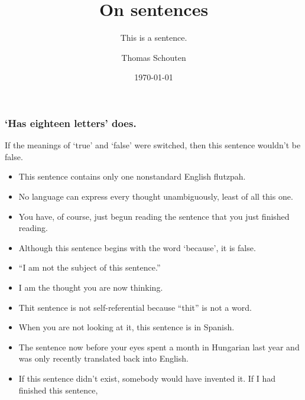 \documentclass{beamer}
\title{On sentences}
\subtitle{This is a sentence.}
\author{Thomas Schouten}
\date{\today}
\begin{document}
    \frame{\titlepage}


%

    \begin{framefont}{\small}
        \begin{frame}
            \frametitle{`Has eighteen letters' does.}
            If the meanings of `true' and `false' were switched, then this sentence wouldn't be false.
            \begin{itemize}
                \item This sentence contains only one nonstandard English flutzpah.
                \item No language can express every thought unambiguously, least of all this one.
                \item You have, of course, just begun reading the sentence that you just finished reading.
                \item Although this sentence begins with the word `because', it is false.
                \item ``I am not the subject of this sentence.''
                \item I am the thought you are now thinking.
                \item Thit sentence is not self-referential because ``thit'' is not a word.
                \item When you are not looking at it, this sentence is in Spanish.
                \item The sentence now before your eyes spent a month in Hungarian last year and was only recently translated back into English.
                \item If this sentence didn't exist, somebody would have invented it.
                If I had finished this sentence,
            \end{itemize}
        \end{frame}
    \end{framefont}
\end{document}
